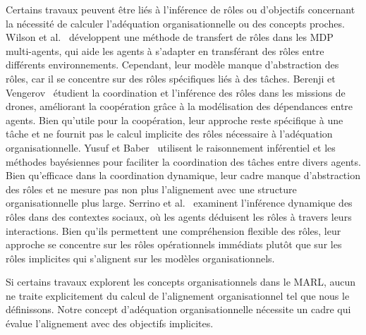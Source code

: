 Certains travaux peuvent être liés à l'inférence de rôles ou d'objectifs concernant la nécessité de calculer l'adéquation organisationnelle ou des concepts proches.
%
Wilson et al.~\cite{wilson2008learning} développent une méthode de transfert de rôles dans les MDP multi-agents, qui aide les agents à s'adapter en transférant des rôles entre différents environnements. Cependant, leur modèle manque d'abstraction des rôles, car il se concentre sur des rôles spécifiques liés à des tâches.
%
Berenji et Vengerov~\cite{berenji2000learning} étudient la coordination et l'inférence des rôles dans les missions de drones, améliorant la coopération grâce à la modélisation des dépendances entre agents. Bien qu'utile pour la coopération, leur approche reste spécifique à une tâche et ne fournit pas le calcul implicite des rôles nécessaire à l'adéquation organisationnelle.
%
Yusuf et Baber~\cite{yusuf2020inferential} utilisent le raisonnement inférentiel et les méthodes bayésiennes pour faciliter la coordination des tâches entre divers agents. Bien qu'efficace dans la coordination dynamique, leur cadre manque d'abstraction des rôles et ne mesure pas non plus l'alignement avec une structure organisationnelle plus large.
%
Serrino et al.~\cite{serrino2019finding} examinent l'inférence dynamique des rôles dans des contextes sociaux, où les agents déduisent les rôles à travers leurs interactions. Bien qu'ils permettent une compréhension flexible des rôles, leur approche se concentre sur les rôles opérationnels immédiats plutôt que sur les rôles implicites qui s'alignent sur les modèles organisationnels.

Si certains travaux explorent les concepts organisationnels dans le MARL, aucun ne traite explicitement du calcul de l'alignement organisationnel tel que nous le définissons. Notre concept d'adéquation organisationnelle nécessite un cadre qui évalue l'alignement avec des objectifs implicites.


